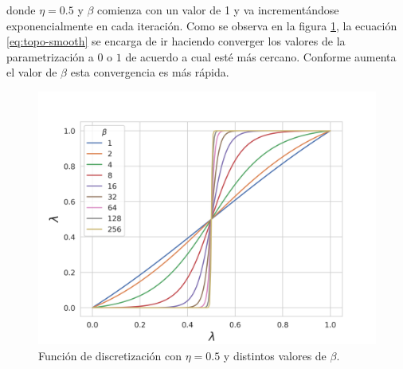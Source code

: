     donde $\eta = 0.5$ y $\beta$ comienza con un valor de 1 y va incrementándose exponencialmente en cada iteración. 
    Como se observa en la figura \ref{fig:discretization}, la ecuación \ref{eq:topo-smooth} se encarga de ir haciendo converger los valores de la parametrización a $0$ o $1$ de acuerdo a cual esté más cercano. 
    Conforme aumenta el valor de $\beta$ esta convergencia es más rápida.

    \begin{figure}[ht]
      \centering
      \includegraphics[scale=0.8]{image/theory/discretization.png}
      \caption{Función de discretización con $\eta = 0.5$ y distintos valores
      de $\beta$.}
      \label{fig:discretization}
    \end{figure}






